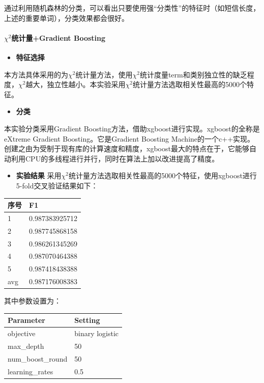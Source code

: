 通过利用随机森林的分类，可以看出只要使用强``分类性''的特征时（如短信长度，上述的重要单词），分类效果都会很好。

\paragraph{\texorpdfstring{\(\chi^2\)统计量+Gradient
Boosting}{\textbackslash{}chi\^{}2统计量+Gradient Boosting}}\label{chi2ux7edfux8ba1ux91cfgradient-boosting}

\begin{itemize}
\tightlist
\item
  \textbf{特征选择}
\end{itemize}

本方法具体采用的为\(\chi^2\)统计量方法，使用\(\chi^2\)统计度量term和类别独立性的缺乏程度，\(\chi^2\)越大，独立性越小。本实验采用\(\chi^2\)统计量方法选取相关性最高的5000个特征。

\begin{itemize}
\tightlist
\item
  \textbf{分类}
\end{itemize}

本实验分类采用Gradient
Boosting方法，借助xgboost进行实现。xgboost的全称是eXtreme Gradient
Boosting。它是Gradient Boosting
Machine的一个c++实现。创建之由为受制于现有库的计算速度和精度，xgboost最大的特点在于，它能够自动利用CPU的多线程进行并行，同时在算法上加以改进提高了精度。

\begin{itemize}
\tightlist
\item
  \textbf{实验结果}
  采用\(\chi^2\)统计量方法选取相关性最高的5000个特征，使用xgboost进行5-fold交叉验证结果如下：
\end{itemize}

\begin{longtable}[]{@{}ll@{}}
\toprule
序号 & F1\tabularnewline
\midrule
\endhead
1 & 0.987383925712\tabularnewline
2 & 0.987745868158\tabularnewline
3 & 0.986261345269\tabularnewline
4 & 0.987070464388\tabularnewline
5 & 0.987418438388\tabularnewline
avg & 0.987176008383\tabularnewline
\bottomrule
\end{longtable}

其中参数设置为：

\begin{longtable}[]{@{}ll@{}}
\toprule
Parameter & Setting\tabularnewline
\midrule
\endhead
objective & binary logistic\tabularnewline
max\_depth & 50\tabularnewline
num\_boost\_round & 50\tabularnewline
learning\_rates & 0.5\tabularnewline
\bottomrule
\end{longtable}

